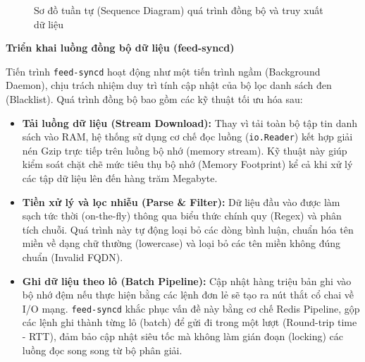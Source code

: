 \begin{figure}[H]
{
    }
    \caption{Sơ đồ tuần tự (Sequence Diagram) quá trình đồng bộ và truy xuất dữ liệu}
    \label{fig:feed_sync_flow}
\end{figure}

\textbf{Triển khai luồng đồng bộ dữ liệu (feed-syncd)}

Tiến trình \texttt{feed-syncd} hoạt động như một tiến trình ngầm (Backgrou\-nd Daemon), chịu trách nhiệm duy trì tính cập nhật của bộ lọc danh sách đen (Blacklist). Quá trình đồng bộ bao gồm các kỹ thuật tối ưu hóa sau:
\begin{itemize}
    \item \textbf{Tải luồng dữ liệu (Stream Download):} Thay vì tải toàn bộ tập tin danh sách vào RAM, hệ thống sử dụng cơ chế đọc luồng (\texttt{io.Reader}) kết hợp giải nén Gzip trực tiếp trên luồng bộ nhớ (memory stream). Kỹ thuật này giúp kiểm soát chặt chẽ mức tiêu thụ bộ nhớ (Memory Footprint) kể cả khi xử lý các tập dữ liệu lên đến hàng trăm Megabyte.
    \item \textbf{Tiền xử lý và lọc nhiễu (Parse \& Filter):} Dữ liệu đầu vào được làm sạch tức thời (on-the-fly) thông qua biểu thức chính quy (Regex) và phân tích chuỗi. Quá trình này tự động loại bỏ các dòng bình luận, chuẩn hóa tên miền về dạng chữ thường (lowercase) và loại bỏ các tên miền không đúng chuẩn (Invalid FQDN).
    \item \textbf{Ghi dữ liệu theo lô (Batch Pipeline):} Cập nhật hàng triệu bản ghi vào bộ nhớ đệm nếu thực hiện bằng các lệnh đơn lẻ sẽ tạo ra nút thắt cổ chai về I/O mạng. \texttt{feed-syncd} khắc phục vấn đề này bằng cơ chế Redis Pipeline, gộp các lệnh ghi thành từng lô (batch) để gửi đi trong một lượt (Round-trip time - RTT), đảm bảo cập nhật siêu tốc mà không làm gián đoạn (locking) các luồng đọc song song từ bộ phân giải.
\end{itemize}

